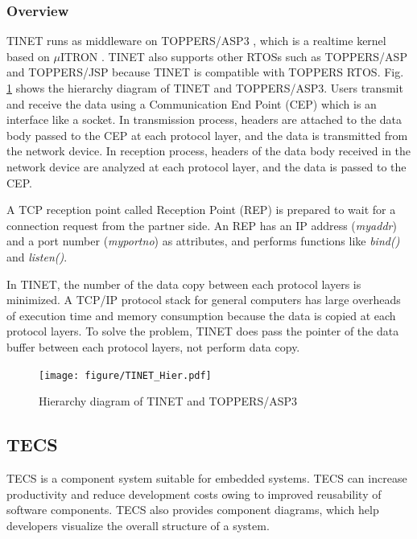 \documentclass[conference]{IEEEtran/IEEEtran}
\begin{document}
\subsubsection{Overview}

TINET runs as middleware on TOPPERS/ASP3 \cite{par:ASP3} \cite{url:ASP3}, which is a realtime kernel based on $\mu$ITRON \cite{par:microITRON}.
TINET also supports other RTOSs such as TOPPERS/ASP and TOPPERS/JSP because TINET is compatible with TOPPERS RTOS.
Fig. \ref{fig:TINET_Hier} shows the hierarchy diagram of TINET and TOPPERS/ASP3.
Users transmit and receive the data using a Communication End Point (CEP) which is an interface like a socket.
In transmission process, headers are attached to the data body passed to the CEP at each protocol layer, and the data is transmitted from the network device.
In reception process, headers of the data body received in the network device are analyzed at each protocol layer, and the data is passed to the CEP.

A TCP reception point called Reception Point (REP) is prepared to wait for a connection request from the partner side.
An REP has an IP address ({\it myaddr}) and a port number ({\it myportno}) as attributes, and performs functions like {\it bind()} and {\it listen()}.

In TINET, the number of the data copy between each protocol layers is minimized.
A TCP/IP protocol stack for general computers has large overheads of execution time and memory consumption because the data is copied at each protocol layers.
To solve the problem, TINET does pass the pointer of the data buffer between each protocol layers, not perform data copy.

\begin{figure}[t]
    \centering
    \texttt{[image: figure/TINET\_Hier.pdf]}
    \caption{Hierarchy diagram of TINET and TOPPERS/ASP3}
    \label{fig:TINET_Hier}
\end{figure}

\subsection{TECS}
\label{sec:TECS}

TECS is a component system suitable for embedded systems.
TECS can increase productivity and reduce development costs owing to improved reusability of software components.
TECS also provides component diagrams, which help developers visualize the overall structure of a system.
\end{document}

